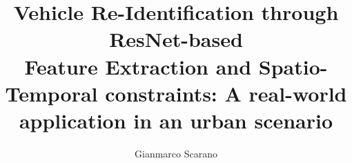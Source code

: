 \documentclass[a4paper, twoside]{sapthesis}
\title{Vehicle Re-Identification through ResNet-based \\Feature Extraction and Spatio-Temporal constraints: A real-world application in an urban scenario}
\author{Gianmarco Scarano}
\begin{document}
    \maketitle
    \dedication{
        you are what you love,\\
        not what loves you.\\
    }
    
    \clearpage
    \frontmatter
    
    
    \clearpage
    \frontmatter
    
    
    \clearpage

    \tableofcontents
    \listoffigures
    \listoftables
    
    \mainmatter
    
    \clearpage
    
    \clearpage
    
    \clearpage
    
    \clearpage
    

    \backmatter
    \clearpage

    \clearpage
    \printglossary


    \clearpage
    

    \clearpage
\end{document}
